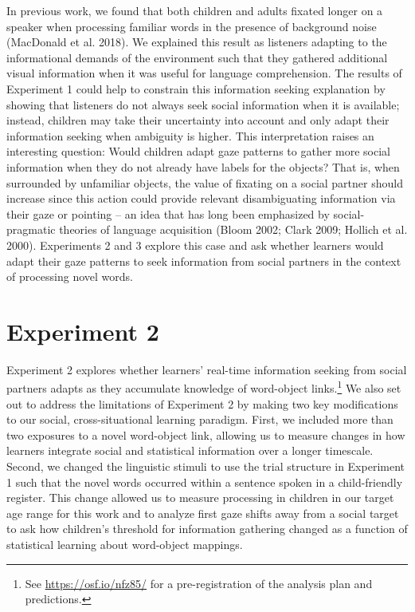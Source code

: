 \documentclass[10pt, letterpaper]{article}
\begin{document}
In previous work, we found that both children and adults fixated longer
on a speaker when processing familiar words in the presence of
background noise (MacDonald et al. 2018). We explained this result as
listeners adapting to the informational demands of the environment such
that they gathered additional visual information when it was useful for
language comprehension. The results of Experiment 1 could help to
constrain this information seeking explanation by showing that listeners
do not always seek social information when it is available; instead,
children may take their uncertainty into account and only adapt their
information seeking when ambiguity is higher. This interpretation raises
an interesting question: Would children adapt gaze patterns to gather
more social information when they do not already have labels for the
objects? That is, when surrounded by unfamiliar objects, the value of
fixating on a social partner should increase since this action could
provide relevant disambiguating information via their gaze or pointing
-- an idea that has long been emphasized by social-pragmatic theories of
language acquisition (Bloom 2002; Clark 2009; Hollich et al. 2000).
Experiments 2 and 3 explore this case and ask whether learners would
adapt their gaze patterns to seek information from social partners in
the context of processing novel words.

\hypertarget{experiment-2}{%
\section{Experiment 2}\label{experiment-2}}

Experiment 2 explores whether learners' real-time information seeking
from social partners adapts as they accumulate knowledge of word-object
links.\footnote{See \url{https://osf.io/nfz85/} for a pre-registration
  of the analysis plan and predictions.} We also set out to address the
limitations of Experiment 2 by making two key modifications to our
social, cross-situational learning paradigm. First, we included more
than two exposures to a novel word-object link, allowing us to measure
changes in how learners integrate social and statistical information
over a longer timescale. Second, we changed the linguistic stimuli to
use the trial structure in Experiment 1 such that the novel words
occurred within a sentence spoken in a child-friendly register. This
change allowed us to measure processing in children in our target age
range for this work and to analyze first gaze shifts away from a social
target to ask how children's threshold for information gathering changed
as a function of statistical learning about word-object mappings.
\end{document}
